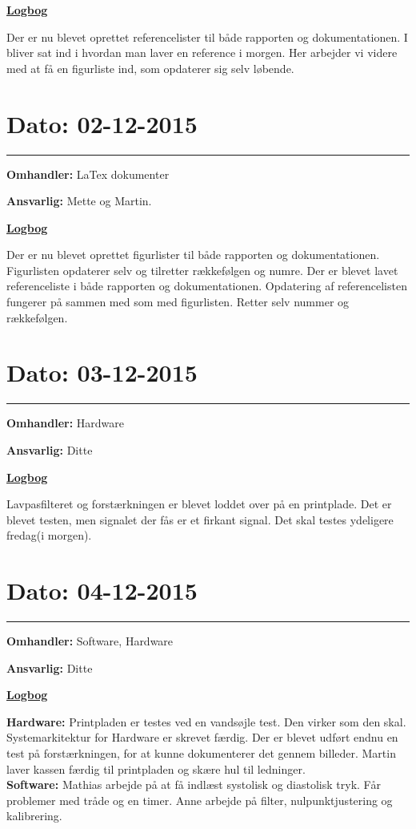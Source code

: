 \underline{\textbf{Logbog}}

Der er nu blevet oprettet referencelister til både rapporten og dokumentationen. I bliver sat ind i hvordan man laver en reference i morgen. Her arbejder vi videre med at få en figurliste ind, som opdaterer sig selv løbende.  
\\

\section{Dato: 02-12-2015}
\hrule
\textbf{Omhandler:} LaTex dokumenter

\textbf{Ansvarlig:} Mette og Martin. 

\underline{\textbf{Logbog}}

Der er nu blevet oprettet figurlister til både rapporten og dokumentationen. Figurlisten opdaterer selv og tilretter rækkefølgen og numre. Der er blevet lavet referenceliste i både rapporten og dokumentationen. Opdatering af referencelisten fungerer på sammen med som med figurlisten. Retter selv nummer og rækkefølgen.  
\\

\section{Dato: 03-12-2015}
\hrule
\textbf{Omhandler:} Hardware

\textbf{Ansvarlig:} Ditte  

\underline{\textbf{Logbog}}

Lavpasfilteret og forstærkningen er blevet loddet over på en printplade. Det er blevet testen, men signalet der fås er et firkant signal. Det skal testes ydeligere fredag(i morgen).  
\\

\section{Dato: 04-12-2015}
\hrule
\textbf{Omhandler:} Software, Hardware

\textbf{Ansvarlig:} Ditte  

\underline{\textbf{Logbog}}


\textbf{Hardware: }Printpladen er testes ved en vandsøjle test. Den virker som den skal. Systemarkitektur for Hardware er skrevet færdig. Der er blevet udført endnu en test på forstærkningen, for at kunne dokumenterer det gennem billeder. Martin laver kassen færdig til printpladen og skære hul til ledninger. \\
\textbf{Software: }Mathias arbejde på at få indlæst systolisk og diastolisk tryk. Får problemer med tråde og en timer. Anne arbejde på filter, nulpunktjustering og kalibrering.    

